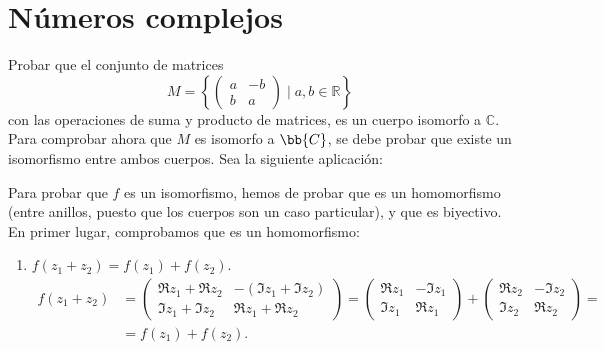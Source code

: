 \section{Números complejos}

\begin{ejercicio}
    Probar que el conjunto de matrices
    \[
        M = \left\{ \begin{pmatrix} a & -b \\ b & a \end{pmatrix} \mid a,b \in \mathbb{R} \right\}
    \]
    con las operaciones de suma y producto de matrices, es un cuerpo isomorfo a $\mathbb{C}$.\\


    Para comprobar ahora que $M$ es isomorfo a $\bb{C}$, se debe probar que existe un isomorfismo entre ambos cuerpos.
    Sea la siguiente aplicación:

    Para probar que $f$ es un isomorfismo, hemos de probar que es un homomorfismo (entre anillos, puesto que los cuerpos son un caso particular), y que es biyectivo. En primer lugar, comprobamos que es un homomorfismo:
    \begin{enumerate}
        \item $f(z_1+z_2)=f(z_1)+f(z_2)$.
        \begin{align*}
            f(z_1+z_2) &= \begin{pmatrix}
                \Re z_1 + \Re z_2 & -(\Im z_1 + \Im z_2) \\
                \Im z_1 + \Im z_2 & \Re z_1 + \Re z_2
            \end{pmatrix}
            = \begin{pmatrix} \Re z_1 & -\Im z_1 \\ \Im z_1 & \Re z_1 \end{pmatrix} + \begin{pmatrix} \Re z_2 & -\Im z_2 \\ \Im z_2 & \Re z_2 \end{pmatrix} =\\&= f(z_1) + f(z_2).
        \end{align*}


\end{enumerate}
\end{ejercicio}
